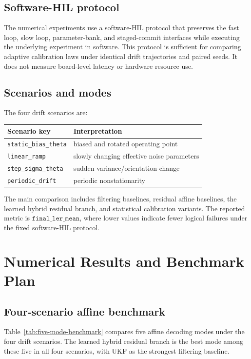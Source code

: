 \documentclass[11pt]{article}
\begin{document}
\subsection{Software-HIL protocol}

The numerical experiments use a software-HIL protocol that preserves the fast
loop, slow loop, parameter-bank, and staged-commit interfaces while executing
the underlying experiment in software.  This protocol is sufficient for
comparing adaptive calibration laws under identical drift trajectories and
paired seeds.  It does not measure board-level latency or hardware resource
use.

\subsection{Scenarios and modes}

The four drift scenarios are:
\begin{center}
\small
\begin{tabular}{ll}
\toprule
Scenario key & Interpretation \\
\midrule
\texttt{static\_bias\_theta} & biased and rotated operating point \\
\texttt{linear\_ramp} & slowly changing effective noise parameters \\
\texttt{step\_sigma\_theta} & sudden variance/orientation change \\
\texttt{periodic\_drift} & periodic nonstationarity \\
\bottomrule
\end{tabular}
\end{center}

The main comparison includes filtering baselines, residual affine baselines,
the learned hybrid residual branch, and statistical calibration variants.  The
reported metric is \(\texttt{final\_ler\_mean}\), where lower values indicate
fewer logical failures under the fixed software-HIL protocol.

\section{Numerical Results and Benchmark Plan}

\subsection{Four-scenario affine benchmark}

Table~\ref{tab:five-mode-benchmark} compares five affine decoding modes under
the four drift scenarios.  The learned hybrid residual branch is the best mode
among these five in all four scenarios, with UKF as the strongest filtering
baseline.
\end{document}
